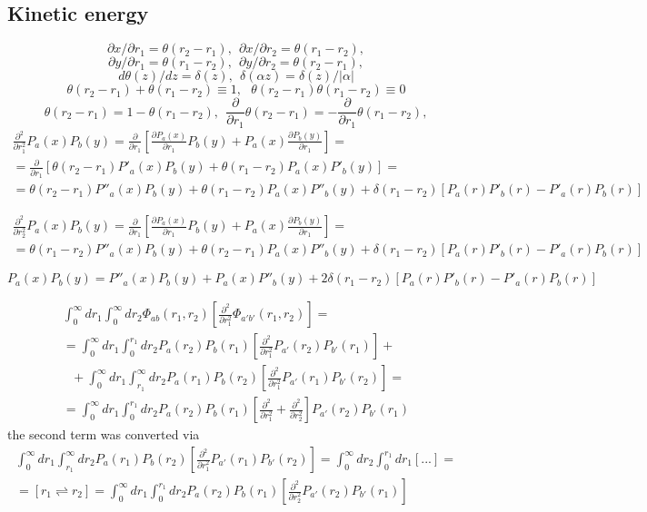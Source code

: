\documentclass[aip
, pra
, showpacs
, aps
, onecolumn
, groupedaddress
, floatfix
]{revtex4}
\newcommand{\beq}{\begin{equation}}
\newcommand{\eeq}{\end{equation}}
\newcommand{\barr}{\begin{array}}
\newcommand{\earr}{\end{array}}
\begin{document}
\subsection{Kinetic energy}
\beq
\partial x / \partial r_1 = \theta(r_2 - r_1), \ \
\partial x / \partial r_2 = \theta(r_1 - r_2),
\eeq
\beq
\partial y / \partial r_1 = \theta(r_1 - r_2), \ \
\partial y / \partial r_2 = \theta(r_2 - r_1),
\eeq
\beq
d \theta(z) / d z = \delta(z), \ \ \delta(\alpha z) = \delta(z)/ |\alpha|
\eeq
\beq
\theta(r_2-r_1) + \theta(r_1-r_2)\equiv 1, 
 \ \ \ \theta(r_2-r_1) \theta(r_1-r_2)\equiv 0
\eeq
\beq
\theta(r_2-r_1)= 1 -\theta(r_1-r_2), \ \
\frac{\partial}{\partial r_1} \theta(r_2-r_1) = -\frac{\partial}{\partial r_1} \theta(r_1-r_2) ,
\eeq
\beq \barr{l}
\frac{\partial^2}{\partial r_1^2} P_a(x) P_b(y) 
=\frac{\partial}{\partial r_1} [ \frac{\partial P_a(x)}{\partial r_1} P_b(y)
+ P_a(x) \frac{\partial P_b(y)}{\partial r_1} ] =\\
=\frac{\partial}{\partial r_1} [ \theta(r_2-r_1) P'_a(x) P_b(y)
 + \theta(r_1-r_2) P_a(x) P'_b(y)]=\\
=\theta(r_2-r_1) P''_a(x) P_b(y) + \theta(r_1-r_2) P_a(x) P''_b(y) 
+\delta(r_1-r_2) [P_a(r) P'_b(r) - P'_a(r) P_b(r)]
\earr \eeq

\beq \barr{l}
\frac{\partial^2}{\partial r_2^2} P_a(x) P_b(y)
=\frac{\partial}{\partial r_1} [ \frac{\partial P_a(x)}{\partial r_1} P_b(y)
+ P_a(x) \frac{\partial P_b(y)}{\partial r_1} ] =\\
=\theta(r_1-r_2) P''_a(x) P_b(y) + \theta(r_2-r_1) P_a(x) P''_b(y)
+\delta(r_1-r_2) [P_a(r) P'_b(r) - P'_a(r) P_b(r)]
\earr \eeq

\beq
[\frac{\partial^2}{\partial r_1^2} + \frac{\partial^2}{\partial r_2^2}] P_a(x) P_b(y)
= P''_a(x) P_b(y) + P_a(x) P''_b(y)
+ 2 \delta(r_1-r_2) [P_a(r) P'_b(r) - P'_a(r) P_b(r)]
\eeq


\beq \barr{l}
\int_0^\infty dr_1 \int_0^\infty dr_2 \Phi_{ab}(r_1, r_2) [\frac{\partial^2}{\partial r_1^2} \Phi_{a'b'}(r_1, r_2)]
=\\
= \int_0^\infty dr_1  \int_0^{r_1} dr_2 P_a(r_2) P_b(r_1) [\frac{\partial^2}{\partial r_1^2} P_{a'}(r_2) P_{b'}(r_1)] +\\
\ \ \ +\int_0^\infty dr_1  \int_{r_1}^\infty dr_2 P_a(r_1) P_b(r_2) [\frac{\partial^2}{\partial r_1^2} P_{a'}(r_1) P_{b'}(r_2)]=\\
= \int_0^\infty dr_1  \int_0^{r_1} dr_2 P_a(r_2) P_b(r_1)
[\frac{\partial^2}{\partial r_1^2} + \frac{\partial^2}{\partial r_2^2} ]
P_{a'}(r_2) P_{b'}(r_1)
\earr \eeq
the second term was converted via
\beq \barr{l}
\int_0^\infty dr_1  \int_{r_1}^\infty dr_2 P_a(r_1) P_b(r_2) [\frac{\partial^2}{\partial r_1^2} P_{a'}(r_1) P_{b'}(r_2)]
= \int_0^\infty dr_2  \int_0^{r_1} dr_1 [...] =\\
= [r_1 \rightleftharpoons r_2]
=\int_0^\infty dr_1  \int_0^{r_1} dr_2 P_a(r_2) P_b(r_1) [\frac{\partial^2}{\partial r_2^2} P_{a'}(r_2) P_{b'}(r_1)]
\earr \eeq
\end{document}
